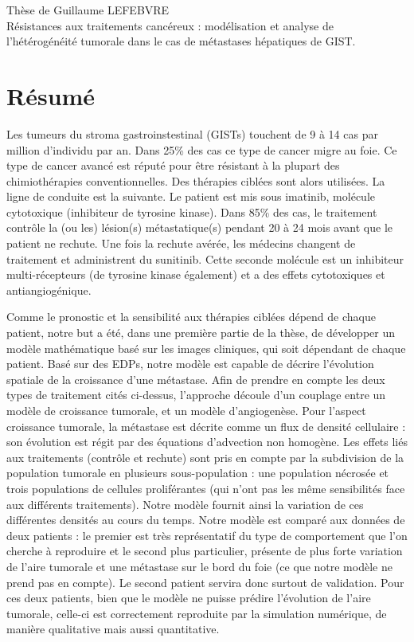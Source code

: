 \documentclass[12pt,a4paper]{article}
\newcommand{\hetero}{hétérogénéité\xspace}
\begin{document}
\begin{center}
\large
Thèse de Guillaume LEFEBVRE \\
\Large
Résistances aux traitements cancéreux : modélisation et analyse de l'\hetero tumorale dans le cas de métastases hépatiques de GIST. 
\end{center}

\section*{Résumé}
Les tumeurs du stroma gastroinstestinal (GISTs) touchent de 9 à 14 cas par million d'individu par an. Dans 25\% des cas ce type de cancer migre au foie. Ce type de cancer avancé est réputé pour être résistant à la plupart des chimiothérapies conventionnelles. Des thérapies ciblées sont alors utilisées. La ligne de conduite est la suivante. Le patient est mis sous imatinib, molécule cytotoxique (inhibiteur de tyrosine kinase). Dans 85\% des cas, le traitement contrôle la (ou les) lésion(s) métastatique(s) pendant 20 à 24 mois avant que le patient ne rechute. Une fois la rechute avérée, les médecins changent de traitement et administrent du sunitinib. Cette seconde molécule est un inhibiteur multi-récepteurs (de tyrosine kinase également) et a des effets cytotoxiques et antiangiogénique. 


Comme le pronostic et la sensibilité aux thérapies ciblées dépend de chaque patient, notre but a été, dans une première partie de la thèse, de développer un modèle mathématique basé sur les images cliniques, qui soit dépendant de chaque patient. 
Basé sur des EDPs, notre modèle est capable de décrire l'évolution spatiale de la croissance d'une métastase. Afin de prendre en compte les deux types de traitement cités ci-dessus, l'approche découle d'un couplage entre un modèle de croissance tumorale, et un modèle d'angiogenèse. Pour l'aspect croissance tumorale, la métastase est décrite comme un flux de densité cellulaire : son évolution est régit par des équations d'advection non homogène. Les effets liés aux traitements (contrôle et rechute) sont pris en compte par la subdivision de la population tumorale en plusieurs sous-population : une population nécrosée et trois populations de cellules proliférantes (qui n'ont pas les même sensibilités face aux différents traitements). Notre modèle fournit ainsi la variation de ces différentes densités au cours du temps. Notre modèle est comparé aux données de deux patients : le premier est très représentatif du type de comportement que l'on cherche à reproduire et le second plus particulier, présente de plus forte variation de l'aire tumorale et une métastase sur le bord du foie (ce que notre modèle ne prend pas en compte). Le second patient servira donc surtout de validation. Pour ces deux patients, bien que le modèle ne puisse prédire l'évolution de l'aire tumorale, celle-ci est correctement reproduite par la simulation numérique, de manière qualitative mais aussi quantitative.
\end{document}
